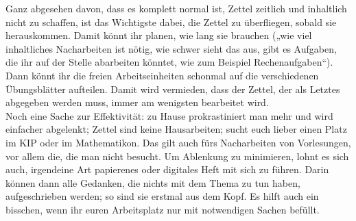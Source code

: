 Ganz abgesehen davon, dass es komplett normal ist, Zettel zeitlich und inhaltlich nicht zu schaffen, ist das Wichtigste dabei, die Zettel zu überfliegen, sobald sie herauskommen. Damit könnt ihr planen, wie lang sie brauchen („wie viel inhaltliches Nacharbeiten ist nötig, wie schwer sieht das aus, gibt es Aufgaben, die ihr auf der Stelle abarbeiten könntet, wie zum Beispiel Rechenaufgaben“). Dann könnt ihr die freien Arbeitseinheiten schonmal auf die verschiedenen Übungsblätter aufteilen. Damit wird vermieden, dass der Zettel, der als Letztes abgegeben werden muss, immer am wenigsten bearbeitet wird. \\
Noch eine Sache zur Effektivität: zu Hause prokrastiniert man mehr und wird einfacher abgelenkt; Zettel sind keine Hausarbeiten; sucht euch lieber einen Platz im \gls{KIP} oder im \gls{Mathematikon}. Das gilt auch fürs Nacharbeiten von Vorlesungen, vor allem die, die man nicht besucht. Um Ablenkung zu minimieren, lohnt es sich auch, irgendeine Art papierenes oder digitales Heft mit sich zu führen. Darin können dann alle Gedanken, die nichts mit dem Thema zu tun haben, aufgeschrieben werden; so sind sie erstmal aus dem Kopf. Es hilft auch ein bisschen, wenn ihr euren Arbeitsplatz nur mit notwendigen Sachen befüllt.
